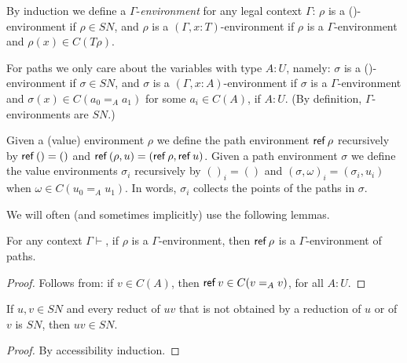 \documentclass[10pt,a4paper]{article}
\newcommand{\SN}{\mathit{SN}}
\newcommand{\Ref}{{\sf ref}}
\begin{document}
\begin{definition}\label{Gammaenvironment}
By induction we define a $\Gamma$-\emph{environment} for any legal context $\Gamma$:
$\rho$ is a ()-environment if $\rho\in\SN$, and $\rho$ is a $(\Gamma,x:T)$-{environment}
if $\rho$ is a $\Gamma$-{environment} and $\rho(x)\in C(T\rho)$.

For paths we only care about the variables with type $A:U$, namely:
$\sigma$ is a ()-environment if $\sigma\in\SN$, and $\sigma$ is a $(\Gamma,x:A)$-{environment}
if $\sigma$ is a $\Gamma$-{environment} and $\sigma(x)\in C(a_0  =_A a_1)$ 
for some $a_i\in C(A)$, if $A:U$. 
(By definition, $\Gamma$-{environments} are $\SN$.)

Given a (value) environment $\rho$ we define the path environment 
$\Ref\,\rho$ recursively by $\Ref\,()=()$ and $\Ref\,(\rho,u)=(\Ref\,\rho,\Ref\,u)$. 
Given a path environment $\sigma$ we define the value environments
$\sigma_i$ recursively by $()_i=()$ and 
$(\sigma,\omega)_i=(\sigma_i,u_i)$ when $\omega\in C(u_0  =_A u_1)$.
In words, $\sigma_i$ collects the points of the paths in $\sigma$.
\end{definition}

We will often (and sometimes implicitly) use the following lemmas.

\begin{lemma}\label{refGammaenv}
For any context $\Gamma\vdash$,
if $\rho$ is a $\Gamma$-environment,
then $\Ref\,\rho$ is a $\Gamma$-environment of paths.
\end{lemma}
\begin{proof} Follows from: if $v\in C(A)$, then $\Ref\,v\in C(v =_A v)$, for all $A:U$.
\end{proof}

\begin{lemma}\label{accindplus}
If $u,v\in\SN$ and every reduct of $uv$ that is not obtained by a reduction
of $u$ or of $v$ is $\SN$, then $uv\in\SN$.
\end{lemma}
\begin{proof} By accessibility induction. \end{proof}
\end{document}
